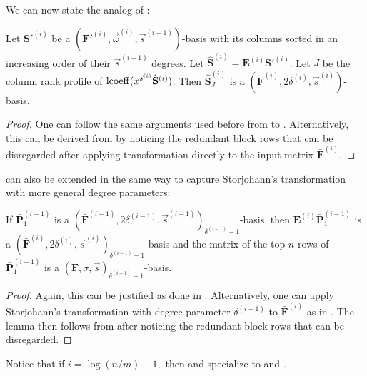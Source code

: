 We can now state the analog of : 
\begin{thm}
\label{thm:extractingOrderBasis}Let $\mathbf{S}'^{\left(i\right)}$
be a $(\mathbf{F}'^{\left(i\right)},\vec{\omega}^{\left(i\right)},\vec{s}^{\left(i-1\right)})$-basis
with its columns sorted in an increasing order of their $\vec{s}^{\left(i-1\right)}$
degrees. Let $\hat{\mathbf{S}}^{\left(i\right)}=\mathbf{E}^{\left(i\right)}\mathbf{S}'^{\left(i\right)}$.
Let $J$ be the column rank profile of $\operatorname{lcoeff}(x^{\vec{s}^{\left(i\right)}}\hat{\mathbf{S}}^{\left(i\right)})$.
Then $\hat{\mathbf{S}}_{J}^{\left(i\right)}$ is a $(\bar{\mathbf{F}}^{\left(i\right)},2\delta^{\left(i\right)},\vec{s}^{\left(i\right)})$-basis.\end{thm}
\begin{proof}
One can follow the same arguments used before from 
to . Alternatively, this
can be derived from  by
noticing the redundant block rows that can be disregarded after applying
transformation  directly to the
input matrix $\bar{\mathbf{F}}^{\left(i\right)}$. 
\end{proof}
 can also be extended in the same way
to capture Storjohann's transformation with more general degree parameters: 
\begin{lem}
\label{lem:linkStorjohanTransform}If $\bar{\mathbf{P}}_{1}^{\left(i-1\right)}$
is a $(\bar{\mathbf{F}}^{\left(i-1\right)},2\delta^{\left(i-1\right)},\vec{s}^{\left(i-1\right)})_{\delta^{\left(i-1\right)}-1}$-basis,
then $\mathbf{E}^{\left(i\right)}\bar{\mathbf{P}}_{1}^{\left(i-1\right)}$
is a $(\bar{\mathbf{F}}^{\left(i\right)},2\delta^{\left(i\right)},\vec{s}^{\left(i\right)})_{\delta^{\left(i-1\right)}-1}$-basis
and the matrix of the top $n$ rows of $\bar{\mathbf{P}}_{1}^{\left(i-1\right)}$
is a $(\mathbf{F},\sigma,\vec{s})_{\delta^{\left(i-1\right)}-1}$-basis.\end{lem}
\begin{proof}
Again, this can be justified as done in .
Alternatively, one can apply Storjohann's transformation with degree
parameter $\delta^{\left(i-1\right)}$ to $\bar{\mathbf{F}}^{\left(i\right)}$
as in . The lemma then
follows from  after noticing the redundant
block rows that can be disregarded. 
\end{proof}
Notice that if $i=\log\left(n/m\right)-1,$ then 
and  specialize to 
and . 
